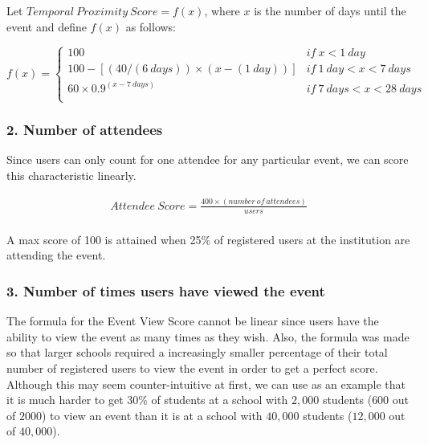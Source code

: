 \documentclass[12pt]{amsart}
\begin{document}
\medskip

\noindent Let $Temporal \ Proximity \ Score = f(x)$, where $x$ is the number of days until the event and define $f(x)$ as follows:

	\begin{displaymath}
		f(x) = \left\{
			\begin{array}{lr}
				100 & if \ x < 1 \ day\\
				100 - \left[(40 / (6 \ days)) \times (x - (1 \ day))\right] & if \ 1 \ day < x < 7 \ days\\
				60 \times 0.9^{(x - 7 \ days)} & if \ 7 \ days < x < 28 \ days\\
			\end{array}
		\right.
	\end{displaymath}

\medskip

\subsubsection*{2. Number of attendees}

Since users can only count for one attendee for any particular event, we can score this characteristic linearly. 

	\begin{align*}
		Attendee \ Score = \frac{400\times(number \ of \ attendees)}{users}\\
	\end{align*}
	
\noindent A max score of 100 is attained when 25\% of registered users at the institution are attending the event.

\medskip

\subsubsection*{3. Number of times users have viewed the event}

The formula for the Event View Score cannot be linear since users have the ability to view the event as many times as they wish. Also, the formula was made so that larger schools required a increasingly smaller percentage of their total number of registered users to view the event in order to get a perfect score. Although this may seem counter-intuitive at first, we can use as an example that it is much harder to get 30\% of students at a school with $2,000$ students ($600$ out of $2000$) to view an event than it is at a school with $40,000$ students ($12,000$ out of $40,000$).
\end{document}
